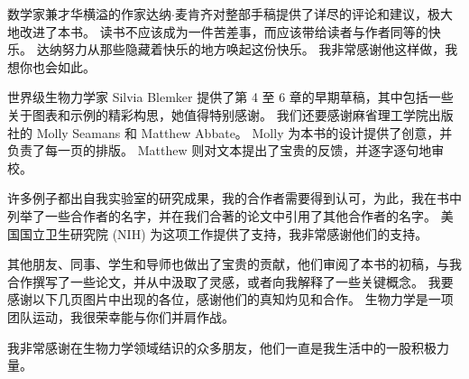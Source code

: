 \documentclass[cn,10pt,citestyle=gb7714-2015, bibstyle=gb7714-2015]{elegantbook}
\begin{document}
数学家兼才华横溢的作家达纳$\cdot$麦肯齐对整部手稿提供了详尽的评论和建议，极大地改进了本书。
读书不应该成为一件苦差事，而应该带给读者与作者同等的快乐。
达纳努力从那些隐藏着快乐的地方唤起这份快乐。
我非常感谢他这样做，我想你也会如此。


世界级生物力学家 Silvia Blemker 提供了第 4 至 6 章的早期草稿，其中包括一些关于图表和示例的精彩构思，她值得特别感谢。
我们还要感谢麻省理工学院出版社的 Molly Seamans 和 Matthew Abbate。
Molly 为本书的设计提供了创意，并负责了每一页的排版。
Matthew 则对文本提出了宝贵的反馈，并逐字逐句地审校。



许多例子都出自我实验室的研究成果，我的合作者需要得到认可，为此，我在书中列举了一些合作者的名字，并在我们合著的论文中引用了其他合作者的名字。
美国国立卫生研究院 (NIH) 为这项工作提供了支持，我非常感谢他们的支持。


其他朋友、同事、学生和导师也做出了宝贵的贡献，他们审阅了本书的初稿，与我合作撰写了一些论文，并从中汲取了灵感，或者向我解释了一些关键概念。
我要感谢以下几页图片中出现的各位，感谢他们的真知灼见和合作。
生物力学是一项团队运动，我很荣幸能与你们并肩作战。



我非常感谢在生物力学领域结识的众多朋友，他们一直是我生活中的一股积极力量。




\tableofcontents

\mainmatter




















\nocite{*} 
\printbibliography
\end{document}
